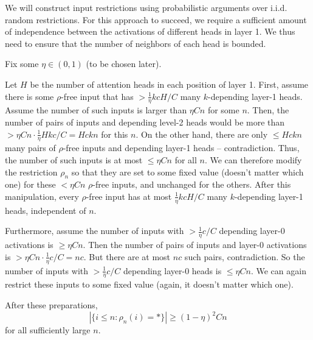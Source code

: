 \documentclass[11pt,a4paper]{article}
\begin{document}


We will construct input restrictions using probabilistic arguments over i.i.d. random restrictions.
For this approach to succeed, we require a  sufficient amount of independence between the activations of different heads in layer 1.
We thus need to ensure that the number of neighbors of each head is bounded.

Fix some $\eta \in (0,1)$ (to be chosen later).

Let $H$ be the number of attention heads in each position of layer 1.
First, assume there is some $\rho$-free input that has $>\frac{1}{\eta}kcH/C$ many $k$-depending layer-1 heads.
Assume the number of such inputs is larger than $\eta Cn$ for some $n$.
Then, the number of pairs of inputs and depending level-2 heads would be more than $> \eta C n \cdot \frac{1}{\eta} H k c/C = Hckn$ for this $n$.
On the other hand, there are only $\leq Hckn$ many pairs of $\rho$-free inputs and depending layer-1 heads -- contradiction.
Thus, the number of such inputs is at most $\leq \eta Cn$ for all $n$.
We can therefore modify the restriction $\rho_n$ so that they are set to some fixed value (doesn't matter which one) for these $<\eta Cn$ $\rho$-free inputs, and unchanged for the others.
After this manipulation, every $\rho$-free input has at most $\frac{1}{\eta}kcH/C$ many $k$-depending layer-1 heads, independent of $n$.

Furthermore, assume the number of inputs with $> \frac{1}{\eta} c/C$ depending layer-0 activations is $\geq \eta Cn$.
Then the number of pairs of inputs and layer-0 activations is $>\eta Cn \cdot \frac{1}{\eta} c/C = nc$.
But there are at most $nc$ such pairs, contradiction.
So the number of inputs with $> \frac{1}{\eta} c/C$ depending layer-0 heads is $\leq \eta Cn$.
We can again restrict these inputs to some fixed value (again, it doesn't matter which one).

After these preparations, 
\begin{equation}
|\{i \leq n: \rho_n(i) = *\}| \geq (1-\eta)^2 C n
\end{equation}
for all sufficiently large $n$.
\end{document}
